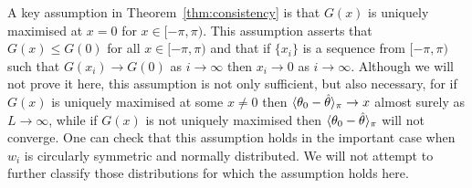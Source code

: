 \documentclass[journal]{IEEEtran}
\begin{document}

A key assumption in Theorem~\ref{thm:consistency} is that $G(x)$ is uniquely maximised at $x = 0$ for $x \in [-\pi, \pi)$.  This assumption asserts that $G(x) \leq G(0)$ for all $x \in [-\pi, \pi)$ and that if $\{x_i\}$ is a sequence from $[-\pi,\pi)$ such that $G(x_i) \rightarrow G(0)$ as $i \rightarrow \infty$ then $x_i \rightarrow 0$ as $i \rightarrow \infty$.  Although we will not prove it here, this assumption is not only sufficient, but also necessary, for if $G(x)$ is uniquely maximised at some $x \neq 0$ then $\langle \theta_0 - \hat{\theta} \rangle_\pi \rightarrow x$ almost surely as $L\rightarrow\infty$, while if $G(x)$ is not uniquely maximised then $\langle \theta_0 - \hat{\theta} \rangle_\pi$ will not converge.  One can check that this assumption holds in the important case when $w_i$ is circularly symmetric and normally distributed.  We will not attempt to further classify those distributions for which the assumption holds here.


\end{document}
